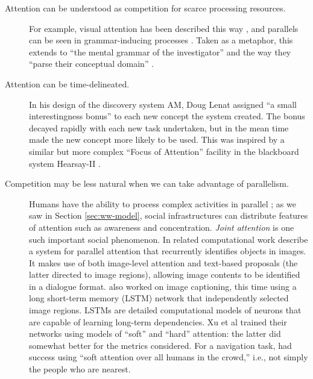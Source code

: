 \begin{description}
\item[Attention can be understood as competition for scarce processing resources.]
   For example, visual attention has been
  described this way \cite{helgason2012attention}, and parallels can
  be seen in grammar-inducing processes \cite{wolff1988learning}.
  Taken as a metaphor, this extends to ``the mental grammar of the
  investigator'' and the way they ``parse their conceptual domain''
  \cite{doi:10.1080/10400410409534554}.
\item[Attention can be time-delineated.]  In his design of the
  discovery system {\sf AM}, Doug Lenat assigned ``a small
  interestingness bonus'' \cite[p.~281]{lenat1984and} to each new
  concept the system created.  The bonus decayed rapidly with each new
  task undertaken, but in the mean time made the new concept more
  likely to be used.  This was inspired by a similar but more complex
  ``Focus of Attention'' facility in the blackboard system {\sf
    Hearsay-II} \cite{lesser1977retrospective}.
\item[Competition may be less natural when we can take advantage of
  parallelism.]  Humans have the ability to process complex activities
  in parallel \cite[pp.~40--42]{blackmore2005consciousness}; as we saw
  in Section \ref{sec:ww-model}, social infrastructures can distribute
  features of attention such as awareness and concentration.
  \emph{Joint attention} is one such important social phenomenon.  In
  related computational work \citet{zhuang2017parallel} describe a
  system for parallel attention that recurrently identifies objects in
  images.  It makes use of both image-level attention and text-based
  proposals (the latter directed to image regions), allowing image
  contents to be identified in a dialogue format.  \citet{xu2015show}
  also worked on image captioning, this time using a long short-term memory
  (LSTM) network that independently selected image regions.
  LSTMs are detailed computational models of neurons that are
  capable of learning long-term dependencies.  Xu et al trained their networks
  using models of ``soft'' and ``hard'' attention: the latter did somewhat better for the metrics
  considered.  For a navigation task, \citet{vemula2017social} had success using ``soft
  attention over all humans in the crowd,'' 
  i.e., not simply the people who are nearest.
\end{description}                        

